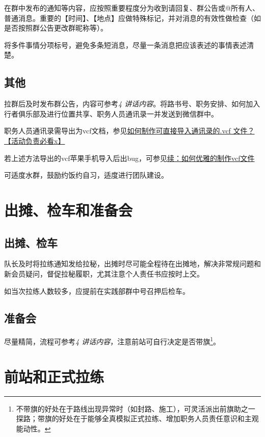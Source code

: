 \documentclass[UTF8]{ctexart}
\begin{document}
在群中发布的通知等内容，应按照重要程度分为收到请回复、群公告或@所有人、普通消息。重要的【时间】、【地点】应做特殊标记，并对消息的有效性做检查（如是否按照群公告更改群昵称等）。

将多件事情分项标号，避免多条短消息，尽量一条消息把应该表述的事情表述清楚。

\subsection{其他}

拉群后及时发布群公告，内容可参考{\color{blue}\textit{4 讲话内容}}。将路书号、职务安排、如何加入行者俱乐部及进行位置共享、职务人员通讯录一并发送到微信群中。

职务人员通讯录需导出为vcf文档，参见\href{https://chexie.net/bbs/content/?bid=7&tid=1039&p=1}{如何制作可直接导入通讯录的.vcf 文件？【活动负责必看x】}

若上述方法导出的vcf苹果手机导入后出bug，可参见\href{https://chexie.net/bbs/content/?bid=7&tid=1133}{续：如何优雅的制作vcf文件}

可适度水群，鼓励约饭约自习，适度进行团队建设。

\section{出摊、检车和准备会}

\subsection{出摊、检车}

队长及时将拉练通知发给拉秘，出摊时尽可能全程待在出摊地，解决非常规问题和新会员疑问，督促拉秘履职，尤其注意个人责任书应按时上交。

如当次拉练人数较多，应提前在实践部群中号召押后检车。

\subsection{准备会}

尽量精简，流程可参考{\color{blue}\textit{4 讲话内容}}，注意前站可自行决定是否带旗\footnote{不带旗的好处在于路线出现异常时（如封路、施工），可灵活派出前旗助之一探路；带旗的好处在于能够全真模拟正式拉练、增加职务人员责任意识和主观能动性。}。

\section{前站和正式拉练}
\end{document}
